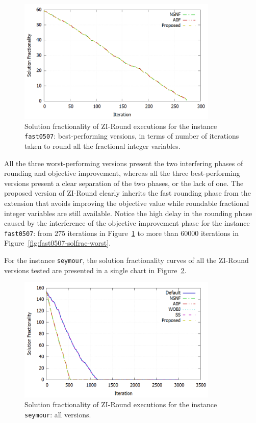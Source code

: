 \documentclass[a4paper,12pt,twoside]{scrbook}
\begin{document}
\begin{figure}[h!]
	\centering
	\includegraphics[width=0.85\textwidth]{fast0507-solfrac-best.png}
	\caption{Solution fractionality of ZI-Round executions for the instance \texttt{fast0507}: best-performing versions, in terms of number of iterations taken to round all the fractional integer variables.}
	\label{fig:fast0507-solfrac-best}
\end{figure}

All the three worst-performing versions present the two interfering phases of rounding and objective improvement, whereas all the three best-performing versions present a clear separation of the two phases, or the lack of one. The proposed version of ZI-Round clearly inherits the fast rounding phase from the extension that avoids improving the objective value while roundable fractional integer variables are still available. Notice the high delay in the rounding phase caused by the interference of the objective improvement phase for the instance \texttt{fast0507}: from $275$ iterations in Figure~\ref{fig:fast0507-solfrac-best} to more than $60000$ iterations in Figure~\ref{fig:fast0507-solfrac-worst}. \par
 
For the instance \texttt{seymour}, the solution fractionality curves of all the ZI-Round versions tested are presented in a single chart in Figure~\ref{fig:seymour-solfrac-all}.

\begin{figure}[ht]
	\centering
	\includegraphics[width=0.85\textwidth]{seymour-solfrac-all.png}
	\caption{Solution fractionality of ZI-Round executions for the instance \texttt{seymour}: all versions.}
	\label{fig:seymour-solfrac-all}
\end{figure}
\end{document}

